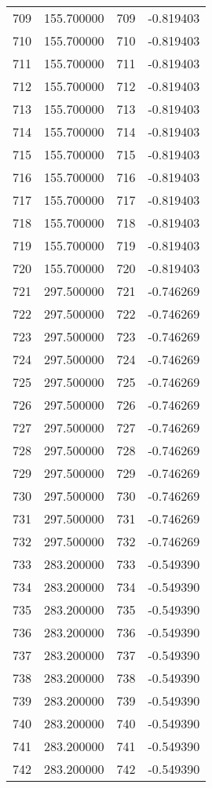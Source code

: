 \documentclass[12pt]{article}
\begin{document}
\begin{longtable}{@{}cccc@{}}
709 & 155.700000 & 709 & -0.819403 \\
710 & 155.700000 & 710 & -0.819403 \\
711 & 155.700000 & 711 & -0.819403 \\
712 & 155.700000 & 712 & -0.819403 \\
713 & 155.700000 & 713 & -0.819403 \\
714 & 155.700000 & 714 & -0.819403 \\
715 & 155.700000 & 715 & -0.819403 \\
716 & 155.700000 & 716 & -0.819403 \\
717 & 155.700000 & 717 & -0.819403 \\
718 & 155.700000 & 718 & -0.819403 \\
719 & 155.700000 & 719 & -0.819403 \\
720 & 155.700000 & 720 & -0.819403 \\
721 & 297.500000 & 721 & -0.746269 \\
722 & 297.500000 & 722 & -0.746269 \\
723 & 297.500000 & 723 & -0.746269 \\
724 & 297.500000 & 724 & -0.746269 \\
725 & 297.500000 & 725 & -0.746269 \\
726 & 297.500000 & 726 & -0.746269 \\
727 & 297.500000 & 727 & -0.746269 \\
728 & 297.500000 & 728 & -0.746269 \\
729 & 297.500000 & 729 & -0.746269 \\
730 & 297.500000 & 730 & -0.746269 \\
731 & 297.500000 & 731 & -0.746269 \\
732 & 297.500000 & 732 & -0.746269 \\
733 & 283.200000 & 733 & -0.549390 \\
734 & 283.200000 & 734 & -0.549390 \\
735 & 283.200000 & 735 & -0.549390 \\
736 & 283.200000 & 736 & -0.549390 \\
737 & 283.200000 & 737 & -0.549390 \\
738 & 283.200000 & 738 & -0.549390 \\
739 & 283.200000 & 739 & -0.549390 \\
740 & 283.200000 & 740 & -0.549390 \\
741 & 283.200000 & 741 & -0.549390 \\
742 & 283.200000 & 742 & -0.549390 \\

\end{longtable}
\end{document}
